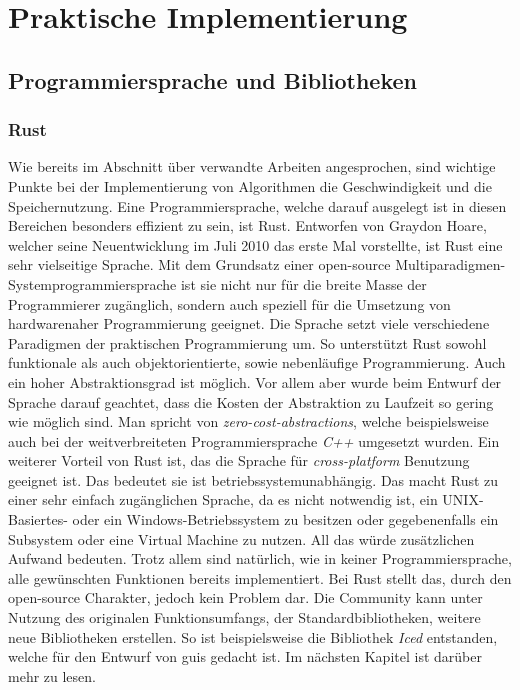 \section{Praktische Implementierung}

\subsection{Programmiersprache und Bibliotheken}
\subsubsection{Rust}
    Wie bereits im Abschnitt über verwandte Arbeiten angesprochen, sind wichtige Punkte bei der Implementierung von Algorithmen die 
    Geschwindigkeit und die Speichernutzung. Eine Programmiersprache, welche darauf ausgelegt ist in diesen Bereichen besonders effizient zu sein, 
    ist Rust. \cite{rust} Entworfen von Graydon Hoare, welcher seine Neuentwicklung im Juli 2010 das erste Mal  vorstellte, ist Rust eine sehr vielseitige Sprache.
    Mit dem Grundsatz einer open-source Multiparadigmen-Systemprogrammiersprache ist sie nicht nur für die breite Masse der Programmierer zugänglich, sondern auch 
    speziell für die Umsetzung von hardwarenaher Programmierung geeignet. Die Sprache setzt viele verschiedene Paradigmen der praktischen Programmierung um. So 
    unterstützt Rust sowohl funktionale als auch objektorientierte, sowie nebenläufige Programmierung. Auch ein hoher Abstraktionsgrad ist möglich. Vor allem aber 
    wurde beim Entwurf der Sprache darauf geachtet, dass die Kosten der Abstraktion zu Laufzeit so gering wie möglich sind. Man spricht von \emph{zero-cost-abstractions}, 
    welche beispielsweise auch bei der weitverbreiteten Programmiersprache \emph{C++} umgesetzt wurden. \cite{rust-wiki}
    Ein weiterer Vorteil von Rust ist, das die Sprache für \emph{cross-platform} Benutzung geeignet ist. Das bedeutet sie ist betriebssystemunabhängig. Das macht Rust zu einer 
    sehr einfach zugänglichen Sprache, da es nicht notwendig ist, ein UNIX-Basiertes- oder ein Windows-Betriebssystem zu besitzen oder gegebenenfalls ein Subsystem oder eine 
    Virtual Machine zu nutzen. All das würde zusätzlichen Aufwand bedeuten.
    Trotz allem sind natürlich, wie in keiner Programmiersprache, alle gewünschten Funktionen bereits implementiert. Bei Rust stellt das, durch den open-source Charakter,
    jedoch kein Problem dar. Die Community kann unter Nutzung des originalen Funktionsumfangs, der Standardbibliotheken, weitere neue Bibliotheken erstellen. 
    So ist beispielsweise die Bibliothek \emph{Iced} entstanden, welche für den Entwurf von \ac{gui}s gedacht ist. Im nächsten Kapitel ist darüber mehr zu lesen.
